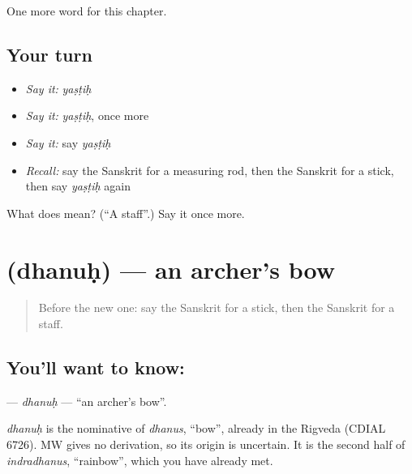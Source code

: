 \begin{grammarlens}[title={What you've built}]
One more word for this chapter.
\end{grammarlens}

\subsection*{Your turn}
\begin{itemize}
\raggedright
  \item \emph{Say it:} \emph{yaṣṭiḥ}
  \item \emph{Say it:} \emph{yaṣṭiḥ}, once more
  \item \emph{Say it:} say \emph{yaṣṭiḥ}
  \item \emph{Recall:} say the Sanskrit for a measuring rod, then the Sanskrit for a stick, then say \emph{yaṣṭiḥ} again
\end{itemize}

\begin{tcolorbox}[breakable,colback=teal!4,colframe=teal!35!black,title={Before you move on}]
What does  mean? (\textquotedblleft{}A staff\textquotedblright{}.) Say it once more.
\end{tcolorbox}
\section[\texorpdfstring{\sk{धनुः} (dhanuḥ)}{धनुः (dhanuḥ)}]{ (dhanuḥ) — an archer's bow}

\label{lesson:SA-C220-dhanuh}



\begin{quote}
Before the new one: say the Sanskrit for a stick, then the Sanskrit for a staff.
\end{quote}

\subsection*{You'll want to know: }
\textbf{} — \emph{dhanuḥ} — \textquotedblleft{}an archer's bow\textquotedblright{}.

\begin{cousinweb}
\emph{dhanuḥ} is the nominative of \emph{dhanus}, \textquotedblleft{}bow\textquotedblright{}, already in the Rigveda (CDIAL 6726). MW gives no derivation, so its origin is uncertain. It is the second half of \emph{indradhanus}, \textquotedblleft{}rainbow\textquotedblright{}, which you have already met.
\end{cousinweb}

